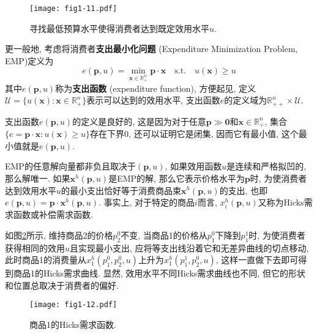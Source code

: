 \documentclass[cn, 12pt, math=mtpro2, bibstyle=apa, blue, twocol]{elegantbook}
\newcommand{\R}{\mathbb{R}}
\newcommand{\p}{\mathbf{p}}
\newcommand{\x}{\mathbf{x}}
\begin{document}
\begin{figure}[htbp!]
  \centering
  \texttt{[image: fig1-11.pdf]}
  \caption{寻找最低预算水平使得消费者达到既定效用水平$u$.}\label{fig1.11}
\end{figure}

更一般地, 考虑将消费者\textbf{支出最小化问题} (Expenditure Minimization Problem, EMP)定义为
\begin{equation}\label{eq1.12}
  e(\p,u)=\min_{\x\in\R_+^n} \p\cdot\x\quad\text{s.t.}\quad u(\x)\ge u
\end{equation}
其中$e(\p,u)$称为\textbf{支出函数} (expenditure function), 方便起见, 定义$\mathcal{U}=\{u(\x):\x\in\R_+^n\}$表示可以达到的效用水平, 支出函数$e$的定义域为$\R_{++}^n\times\mathcal{U}$.

支出函数$e(\p,u)$的定义是良好的, 这是因为对于任意$\p\gg\mathbf{0}$和$\x\in\R_+^n$, 集合$\{e=\p\cdot\x: u(\x)\geq u\}$存在下界0, 还可以证明它是闭集, 因而它有最小值, 这个最小值就是$e(\p,u)$.

EMP的任意解向量都非负且取决于$(\p,u)$, 如果效用函数$u$是连续和严格拟凹的, 那么解唯一. 如果$\x^h(\p,u)$是EMP的解, 那么它表示价格水平为$\p$时, 为使消费者达到效用水平$u$的最小支出恰好等于消费商品束$\x^h(\p,u)$的支出, 也即$e(\p,u)=\p\cdot\x^h(\p,u)$. 事实上, 对于特定的商品$i$而言, $x_i^h(\p,u)$又称为Hicks需求函数或补偿需求函数.

如图\ref{fig1.12}所示, 维持商品2的价格$p_2^0$不变, 当商品1的价格从$p_1^0$下降到$p_1^1$时, 为使消费者获得相同的效用$u$且实现最小支出, 应将等支出线沿着它和无差异曲线的切点移动, 此时商品1的消费量从$x_1^h(p_1^0,p_2^0,u)$上升为$x_1^h(p_1^1,p_2^0,u)$, 这样一直做下去即可得到商品1的Hicks需求曲线. 显然, 效用水平不同Hicks需求曲线也不同, 但它的形状和位置总取决于消费者的偏好.
\begin{figure}[htbp!]
  \centering
  \texttt{[image: fig1-12.pdf]}
  \caption{商品1的Hicks需求函数.}\label{fig1.12}
\end{figure}
\end{document}
